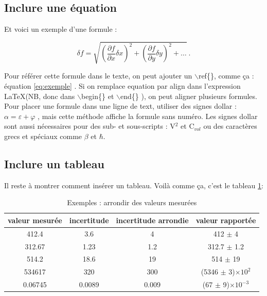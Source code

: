 \documentclass[french,11pt]{article}
\begin{document}
\subsection*{Inclure une équation}
Et voici un exemple d'une formule :

\begin{equation}
\delta f=\sqrt{\left(\frac{\partial f}{\partial x}\delta x\right)^2+\left(\frac{\partial f}{\partial y}\delta y\right)^2+\ldots}\ .
\label{eq:exemple}
\end{equation}

Pour référer cette formule dans le texte, on peut ajouter un $\backslash$ref\{\}, comme ça : \og équation \ref{eq:exemple} \fg{}. Si on remplace \og equation \fg{} par \og align \fg{} dans l'expression \LaTeX (NB, donc dans \og $\backslash$begin\{\} \fg{} et \og $\backslash$end\{\} \fg{}), on peut aligner plusieurs formules. Pour placer une formule dans une ligne de text, utiliser des signes dollar : $\alpha = \varepsilon + \varphi$ , mais cette méthode affiche la formule sans numéro. Les signes dollar sont aussi nécessaires pour des sub- et sous-scripts : V$^{2}$ et C$_{vol}$ ou des caractères grecs et spéciaux comme $\beta$ et $\hbar$.

\medskip
\subsection*{Inclure un tableau}

Il reste à montrer comment insérer un tableau. Voilà comme ça, c'est le tableau \ref{table:sign}:
\begin{table}[!ht]
\caption{Exemples : arrondir des valeurs mesurées} %
\centering %
\begin{tabular}{c c c c} %
\hline\hline %
valeur mesurée & incertitude & incertitude arrondie & valeur rapportée \\
\hline
412.4 & 3.6 & 4 & 412 $\pm$ 4 \\
312.67 & 1.23 & 1.2 & 312.7 $\pm$ 1.2 \\
514.2 & 18.6 & 19 & 514 $\pm$ 19 \\
534617 & 320 & 300 & (5346 $\pm$ 3)$\times 10^2$ \\
0.06745 & 0.0089 & 0.009 & (67 $\pm$ 9)$\times10^{-3}$ \\
\hline %
\end{tabular}
\label{table:sign} 
\end{table}
\end{document}
